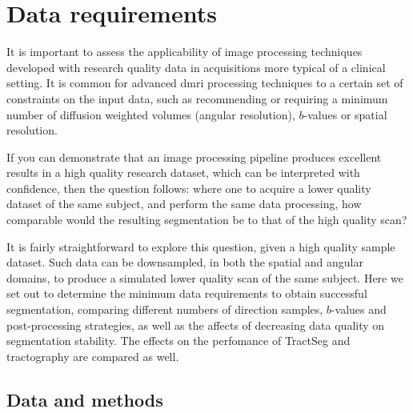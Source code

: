 \section{Data requirements}



It is important to assess the applicability of image processing techniques developed with research quality data in acquisitions more typical of a clinical setting.
It is common for advanced \gls{dmri} processing techniques to  a certain set of constraints on the input data, such as recommending or requiring a minimum number of diffusion weighted volumes (angular resolution), $b$-values or spatial resolution.

If you can demonstrate that an image processing pipeline produces excellent results in a high quality research dataset, which can be interpreted with confidence, then the question follows: where one to acquire a lower quality dataset of the same subject, and perform the same data processing, how comparable would the resulting segmentation be to that of the high quality scan?

It is fairly straightforward to explore this question, given a high quality sample dataset.
Such data can be downsampled, in both the spatial and angular domains, to produce a simulated lower quality scan of the same subject.
Here we set out to determine the minimum data requirements to obtain successful segmentation, comparing different numbers of direction samples, $b$-values and post-processing strategies, as well as the affects of decreasing data quality on segmentation stability.
The effects on the perfomance of TractSeg and tractography are compared as well.

\subsection{Data and methods}

